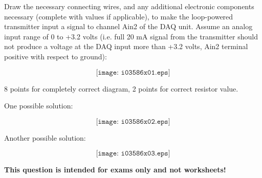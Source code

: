 

Draw the necessary connecting wires, and any additional electronic components necessary (complete with values if applicable), to make the loop-powered transmitter input a signal to channel Ain2 of the DAQ unit.  Assume an analog input range of 0 to +3.2 volts (i.e. full 20 mA signal from the transmitter should not produce a voltage at the DAQ input more than +3.2 volts, Ain2 terminal positive with respect to ground):

$$\texttt{[image: i03586x01.eps]}$$







8 points for completely correct diagram, 2 points for correct resistor value.

\vskip 10pt

One possible solution:

$$\texttt{[image: i03586x02.eps]}$$

Another possible solution:

$$\texttt{[image: i03586x03.eps]}$$







{\bf This question is intended for exams only and not worksheets!}



